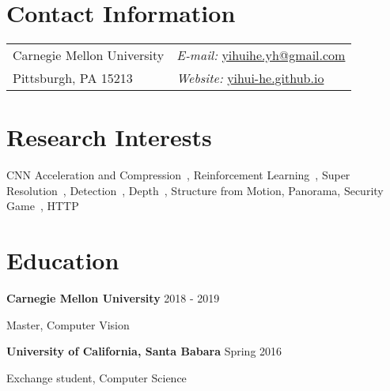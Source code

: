 \documentclass[margin,line]{res}
\newenvironment{list1}{
  \begin{list}{\ding{113}}{%
      \setlength{\itemsep}{0in}
      \setlength{\parsep}{0in} \setlength{\parskip}{0in}
      \setlength{\topsep}{0in} \setlength{\partopsep}{0in} 
      \setlength{\leftmargin}{0.17in}}}{\end{list}}
\begin{document}
\nocite{*}


\begin{resume}
\section{\sc Contact Information}
\vspace{.05in}
\begin{tabular}{@{}p{2in}p{4in}}        
Carnegie Mellon University & {\it E-mail:}  
\href{mailto:yihuihe.yh@gmail.com}{yihuihe.yh@gmail.com}\\       
Pittsburgh, PA 15213  & {\it Website:} 
\href{http://yihui-he.github.io/}{yihui-he.github.io} \\     
\end{tabular}


\section{\sc Research Interests}
CNN Acceleration and Compression~\cite{He_2017_ICCV,adc,tpami}, 
Reinforcement Learning~\cite{adc}, 
Super Resolution~\cite{liang2017single}, 
Detection~\cite{He_2017_ICCV}, 
Depth~\cite{he2017estimated}, 
Structure from Motion, Panorama, 
Security Game~\cite{ma2017vehicle}, 
HTTP~\cite{pid}
\section{\sc Education}
{\bf Carnegie Mellon University} \hfill {2018 - 2019}\\
\vspace*{-.1in}
\begin{list1}
\item[] Master, Computer Vision
\end{list1}

{\bf University of California, Santa Babara} \hfill {Spring 2016}\\
\vspace*{-.1in}
\begin{list1}
\item[] Exchange student, Computer Science %
\end{list1}


\end{resume}
\end{document}
